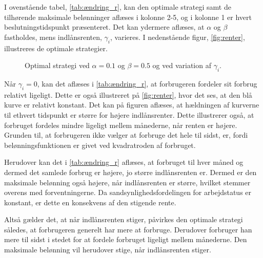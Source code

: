 

I ovenstående tabel, \autoref{tab:ændring_r}, kan den optimale strategi samt de tilhørende maksimale belønninger aflæses i kolonne 2-5, og i kolonne 1 er hvert beslutningstidspunkt præsenteret. Det kan ydermere aflæses, at $\alpha$ og $\beta$ fastholdes, mens indlånsrenten, $\gamma_i$, varieres. I nedenstående figur, \autoref{fig:renter}, illustreres de optimale strategier.

\begin{figure}[H]
    \begin{center}
        \resizebox{12cm}{!}{}
    \end{center}
    \caption{Optimal strategi ved $\alpha=0.1$ og $\beta=0.5$ og ved variation af $\gamma_i$.}\label{fig:renter}
\end{figure}

Når $\gamma_i=0$, kan det aflæses i \autoref{tab:ændring_r}, at forbrugeren fordeler sit forbrug relativt ligeligt. Dette er også illustreret på \autoref{fig:renter}, hvor det ses, at den blå kurve er relativt konstant. Det kan på figuren aflæses, at hældningen af kurverne til ethvert tidspunkt er større for højere indlånsrenter. Dette illustrerer også, at forbruget fordeles mindre ligeligt mellem månederne, når renten er højere. Grunden til, at forbrugeren ikke vælger at forbruge det hele til sidst, er, fordi belønningsfunktionen er givet ved kvadratroden af forbruget. 

Herudover kan det i \autoref{tab:ændring_r} aflæses, at forbruget til hver måned og dermed det samlede forbrug er højere, jo større indlånsrenten er. Dermed er den maksimale belønning også højere, når indlånsrenten er større, hvilket stemmer overens med forventningerne. Da sandsynlighedsfordelingen for arbejdstatus er konstant, er dette en konsekvens af den stigende rente.

Altså gælder det, at når indlånsrenten stiger, påvirkes den optimale strategi således, at forbrugeren generelt har mere at forbruge. Derudover forbruger han mere til sidst i stedet for at fordele forbruget ligeligt mellem månederne. Den maksimale belønning vil herudover stige, når indlånsrenten stiger.




